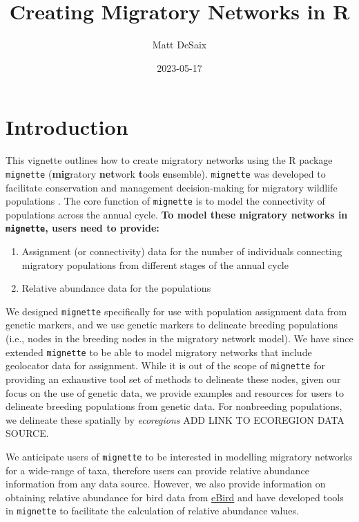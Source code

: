 \documentclass[
]{book}
\title{Creating Migratory Networks in R}
\author{Matt DeSaix}
\date{2023-05-17}
\providecommand{\tightlist}{%
  \setlength{\itemsep}{0pt}\setlength{\parskip}{0pt}}
\begin{document}
\maketitle

{
\setcounter{tocdepth}{1}
\tableofcontents
}
\hypertarget{introduction}{%
\chapter{Introduction}\label{introduction}}

This vignette outlines how to create migratory networks using the R package \texttt{mignette} (\textbf{mig}ratory \textbf{net}work \textbf{t}ools \textbf{e}nsemble). \texttt{mignette} was developed to facilitate conservation and management decision-making for migratory wildlife populations \citep{ruegg2020genoscape, taylor2010population}. The core function of \texttt{mignette} is to model the connectivity of populations across the annual cycle. \textbf{To model these migratory networks in \texttt{mignette}, users need to provide:}

\begin{enumerate}
\def\labelenumi{\arabic{enumi}.}
\tightlist
\item
  Assignment (or connectivity) data for the number of individuals connecting migratory populations from different stages of the annual cycle
\item
  Relative abundance data for the populations
\end{enumerate}

We designed \texttt{mignette} specifically for use with population assignment data from genetic markers, and we use genetic markers to delineate breeding populations (i.e., nodes in the breeding nodes in the migratory network model). We have since extended \texttt{mignette} to be able to model migratory networks that include geolocator data for assignment. While it is out of the scope of \texttt{mignette} for providing an exhaustive tool set of methods to delineate these nodes, given our focus on the use of genetic data, we provide examples and resources for users to delineate breeding populations from genetic data. For nonbreeding populations, we delineate these spatially by \emph{ecoregions} ADD LINK TO ECOREGION DATA SOURCE.

We anticipate users of \texttt{mignette} to be interested in modelling migratory networks for a wide-range of taxa, therefore users can provide relative abundance information from any data source. However, we also provide information on obtaining relative abundance for bird data from \href{https://ebird.org/science/status-and-trends}{eBird} and have developed tools in \texttt{mignette} to facilitate the calculation of relative abundance values.
\end{document}
